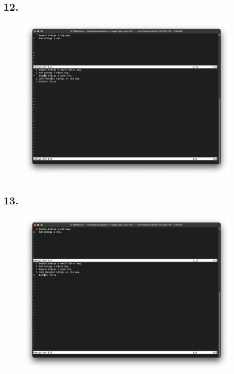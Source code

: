 \documentclass{article}
\begin{document}
    \subsection*{12.}
    \begin{figure}[H]
        \centering
        \includegraphics[width=\textwidth]{2/12.png}
    \end{figure}

    \subsection*{13.}
    \begin{figure}[H]
        \centering
        \includegraphics[width=\textwidth]{2/13.png}
    \end{figure}
\end{document}
